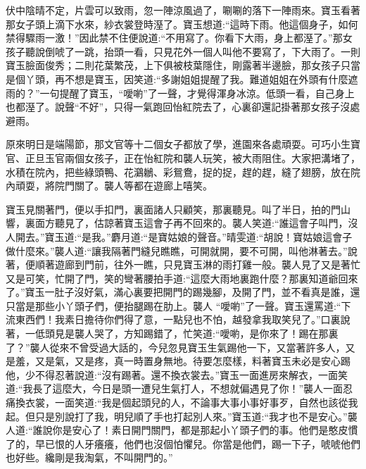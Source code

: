 \begin{parag}
    伏中陰晴不定，片雲可以致雨，忽一陣涼風過了，唰唰的落下一陣雨來。寶玉看著那女子頭上滴下水來，紗衣裳登時溼了。寶玉想道:“這時下雨。他這個身子，如何禁得驟雨一激！”因此禁不住便說道:“不用寫了。你看下大雨，身上都溼了。”那女孩子聽說倒唬了一跳，抬頭一看，只見花外一個人叫他不要寫了，下大雨了。一則寶玉臉面俊秀；二則花葉繁茂，上下俱被枝葉隱住，剛露著半邊臉，那女孩子只當是個丫頭，再不想是寶玉，因笑道:“多謝姐姐提醒了我。難道姐姐在外頭有什麼遮雨的？”一句提醒了寶玉，“噯喲”了一聲，才覺得渾身冰涼。低頭一看，自己身上也都溼了。說聲“不好”，只得一氣跑回怡紅院去了，心裏卻還記掛著那女孩子沒處避雨。
\end{parag}


\begin{parag}
    原來明日是端陽節，那文官等十二個女子都放了學，進園來各處頑耍。可巧小生寶官、正旦玉官兩個女孩子，正在怡紅院和襲人玩笑，被大雨阻住。大家把溝堵了，水積在院內，把些綠頭鴨、花鸂鶒、彩鴛鴦，捉的捉，趕的趕，縫了翅膀，放在院內頑耍，將院門關了。襲人等都在遊廊上嘻笑。
\end{parag}


\begin{parag}
    寶玉見關著門，便以手扣門，裏面諸人只顧笑，那裏聽見。叫了半日，拍的門山響，裏面方聽見了，估諒著寶玉這會子再不回來的。襲人笑道:“誰這會子叫門，沒人開去。”寶玉道:“是我。”麝月道:“是寶姑娘的聲音。”晴雯道:“胡說！寶姑娘這會子做什麼來。”襲人道:“讓我隔著門縫兒瞧瞧，可開就開，要不可開，叫他淋著去。”說著，便順著遊廊到門前，往外一瞧，只見寶玉淋的雨打雞一般。襲人見了又是著忙又是可笑，忙開了門，笑的彎著腰拍手道:“這麼大雨地裏跑什麼？那裏知道爺回來了。”寶玉一肚子沒好氣，滿心裏要把開門的踢幾腳，及開了門，並不看真是誰，還只當是那些小丫頭子們，便抬腿踢在肋上。襲人 “噯喲”了一聲。寶玉還罵道:“下流東西們！我素日擔待你們得了意，一點兒也不怕，越發拿我取笑兒了。”口裏說著，一低頭見是襲人哭了，方知踢錯了，忙笑道:“噯喲，是你來了！踢在那裏了？”襲人從來不曾受過大話的，今兒忽見寶玉生氣踢他一下，又當著許多人，又是羞，又是氣，又是疼，真一時置身無地。待要怎麼樣，料著寶玉未必是安心踢他，少不得忍著說道:“沒有踢著。還不換衣裳去。”寶玉一面進房來解衣，一面笑道:“我長了這麼大，今日是頭一遭兒生氣打人，不想就偏遇見了你！”襲人一面忍痛換衣裳，一面笑道:“我是個起頭兒的人，不論事大事小事好事歹，自然也該從我起。但只是別說打了我，明兒順了手也打起別人來。”寶玉道:“我才也不是安心。”襲人道:“誰說你是安心了！素日開門關門，都是那起小丫頭子們的事。他們是憨皮慣了的，早已恨的人牙癢癢，他們也沒個怕懼兒。你當是他們，踢一下子，唬唬他們也好些。纔剛是我淘氣，不叫開門的。”
\end{parag}


